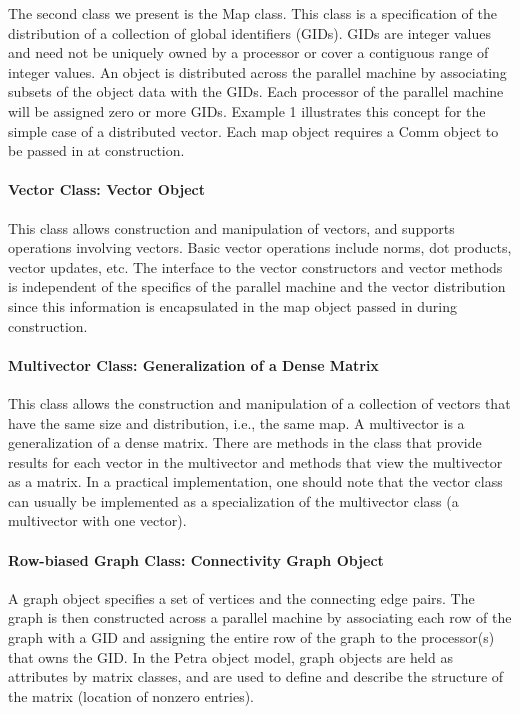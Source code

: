 \documentclass[12pt,relax]{PetraObjectModel}
\begin{document}
The second class we present is the Map class.  This class is a 
specification of the distribution of a collection of global identifiers 
(GIDs).  GIDs are integer values and need not be uniquely owned by a 
processor or cover a contiguous range of integer values.  An object is 
distributed across the parallel machine by associating subsets of the 
object data with the GIDs.  Each processor of the parallel machine will be 
assigned zero or more GIDs.  Example 1 illustrates this concept for the 
simple case of a distributed vector.   Each map object requires a Comm 
object to be passed in at construction.

\paragraph{Vector Class:  Vector Object}

This class allows construction and manipulation of vectors, and supports 
operations involving vectors.  Basic vector 
operations include norms, dot products, vector updates, etc.  The interface 
to the vector constructors and vector methods is independent of the specifics 
of the parallel machine and the vector distribution since this information is 
encapsulated in the map object passed in during construction.

\paragraph{Multivector Class:  Generalization of a Dense Matrix}

This class allows the construction and manipulation of a collection of 
vectors that have the same size and distribution, i.e., the same map.  
A multivector is a generalization of a dense matrix.  There are methods 
in the class that provide results for each vector in the multivector and 
methods that view the multivector as a matrix.  In a practical implementation, 
one should note that the vector class can usually be implemented as a 
specialization of the multivector class (a multivector with one vector).

\paragraph{Row-biased Graph Class:  Connectivity Graph Object}

A graph object specifies a set of vertices and the connecting edge pairs.
The graph is then constructed across a parallel machine by associating each
row of the graph with a GID and assigning the entire row of the graph to the
processor(s) that owns the GID. In the Petra object model, graph objects are
held as attributes by matrix classes, and are used to define and describe the
structure of the matrix (location of nonzero entries).
\end{document}
